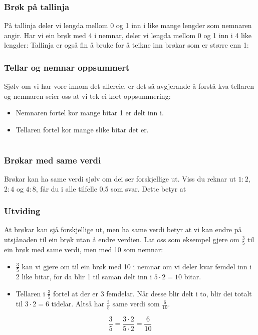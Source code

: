 \newpage
\subsubsection{Brøk på tallinja}
På tallinja deler vi lengda mellom 0 og 1 inn i like mange lengder som nemnaren angir. Har vi ein brøk med 4 i nemnar, deler vi lengda mellom 0 og 1 inn i 4 like lengder:
Tallinja er også fin å bruke for å teikne inn brøkar som er større enn 1:
\subsubsection{Tellar og nemnar oppsummert}
Sjølv om vi har vore innom det allereie, er det så avgjerande å forstå kva tellaren og nemnaren seier oss at vi tek ei kort oppsummering:
\begin{itemize}
	\item Nemnaren fortel kor mange bitar 1 er delt inn i.
	\item Tellaren fortel kor mange slike bitar det er.
\end{itemize}
\newpage
\section{\brvu}
\subsubsection{Brøkar med same verdi}

Brøkar kan ha same verdi sjølv om dei ser forskjellige ut. Viss du reknar ut $ 1:2 $, $ 2:4 $ og $ 4:8 $, får du i alle tilfelle 0,5 som svar. Dette betyr at
 \\[5pt]
 \vsk
{}
\subsubsection{Utviding}
At brøkar kan sjå forskjellige ut, men ha same verdi betyr at vi kan endre på utsjånaden til ein brøk utan å endre verdien. Lat oss som eksempel gjere om $ \frac{3}{5} $ til ein brøk med same verdi, men med 10 som nemnar:
\begin{itemize}
	\item $ \frac{3}{5} $ kan vi gjere om til ein brøk med 10 i nemnar om vi deler kvar femdel inn i 2 like bitar, for da blir 1 til saman delt inn i $ {5\cdot2=10} $ bitar.
	\item Tellaren i $ \frac{3}{5} $ fortel at der er 3 femdelar. Når desse blir delt i to, blir dei totalt til $ 3\cdot2=6 $ tidelar. Altså har $ \frac{3}{5} $ same verdi som $ \frac{6}{10} $.
\end{itemize}
\[ \frac{3}{5}=\frac{3\cdot2}{5\cdot2}=\frac{6}{10} \]

